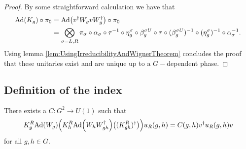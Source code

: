 \documentclass[11pt,a4paper,twoside]{article}
\numberwithin{equation}{section}
\begin{document}
\begin{proof}
	By some straightforward calculation we have that
	\begin{align}
		\Ad{K_g}\circ\pi_0&=\Ad{v^\dagger W_g v W_g^\dagger}\circ\pi_0\\
		&=\bigotimes_{\sigma=L,R}\pi_\sigma\circ\alpha_\sigma\circ\tau^{-1}\circ \eta_g^\sigma\circ\beta_g^{\sigma U}\circ\tau\circ(\beta_g^{\sigma U})^{-1}\circ(\eta_g^{\sigma})^{-1}\circ\alpha_\sigma^{-1}.
	\end{align}
	Using lemma \ref{lem:UsingIrreducibilityAndWignerTheorem} concludes the proof that these unitaries exist and are unique up to a $G-$dependent phase.
\end{proof}
\subsection{Definition of the index}\label{sec:DefinitionH2Index}
\begin{lemma}\label{lem:Definition2Cochain}
	There exists a $C:G^2\rightarrow U(1)$ such that 
	\begin{equation}\label{eq:Definition2Cochain}
		K_g^R\Ad{W_g}\left(K_h^R\Ad{W_hW_{gh}^\dagger}\left((K_{gh}^R)^\dagger\right)\right)u_
		R(g,h)=C(g,h)v^\dagger u_R(g,h)v
	\end{equation}
	for all $g,h\in G.$
\end{lemma}
\end{document}
